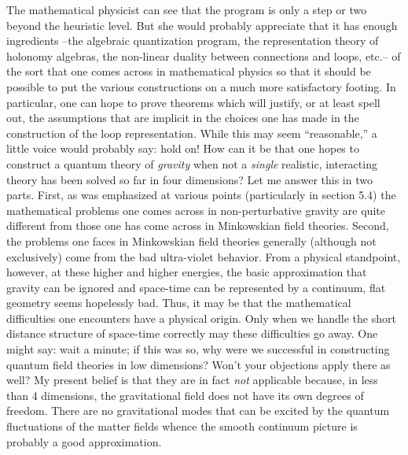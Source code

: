 The mathematical physicist can see that the program is only a step or two
beyond the heuristic level. But she would probably appreciate that it has
enough ingredients --the algebraic quantization program, the representation
theory of holonomy algebras, the non-linear duality between connections and
loops, etc.-- of the sort that one comes across in mathematical physics so that
it should be possible to put the various constructions on a much more
satisfactory footing. In particular, one can hope to prove theorems which
will justify, or at least spell out, the assumptions that are implicit in the
choices one has made in the construction of the loop representation. While
this may seem ``reasonable,'' a little voice would probably say: hold on!
How can it be that one hopes to construct a quantum theory of {\it gravity}
when not a {\it single} realistic, interacting theory has been solved so far
in four dimensions? Let me answer this in two parts. First, as was emphasized
at various points (particularly in section 5.4) the mathematical problems one
comes across in non-perturbative gravity are quite different from those one
has come across in Minkowskian field theories. Second, the problems one faces
in Minkowskian field theories generally (although not exclusively) come from
the bad ultra-violet behavior. From a physical standpoint, however, at these
higher and higher energies, the basic approximation that gravity can be
ignored and space-time can be represented by a continuum, flat geometry
seems hopelessly bad. Thus, it may be that the mathematical difficulties one
encounters have a physical origin. Only when we handle the short distance
structure of space-time correctly may these difficulties go away. One might
say: wait a minute; if this was so, why were we successful in constructing
quantum field theories in low dimensions? Won't your objections apply there
as well? My present belief is that they are in fact {\it not} applicable
because, in less than 4 dimensions, the gravitational field does not have its
own degrees of freedom. There are no gravitational modes that can be
excited by the quantum fluctuations of the matter fields whence the smooth
continuum picture is probably a good approximation.

